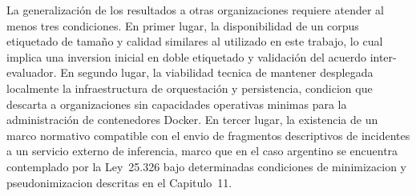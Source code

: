 La generalización de los resultados a otras organizaciones requiere atender al menos tres condiciones. En primer lugar, la disponibilidad de un corpus etiquetado de tamaño y calidad similares al utilizado en este trabajo, lo cual implica una inversion inicial en doble etiquetado y validación del acuerdo inter-evaluador. En segundo lugar, la viabilidad tecnica de mantener desplegada localmente la infraestructura de orquestación y persistencia, condicion que descarta a organizaciones sin capacidades operativas minimas para la administración de contenedores Docker. En tercer lugar, la existencia de un marco normativo compatible con el envio de fragmentos descriptivos de incidentes a un servicio externo de inferencia, marco que en el caso argentino se encuentra contemplado por la Ley~25.326 \parencite{Ley25326_2000} bajo determinadas condiciones de minimizacion y pseudonimizacion descritas en el Capitulo~11.

\newpage
